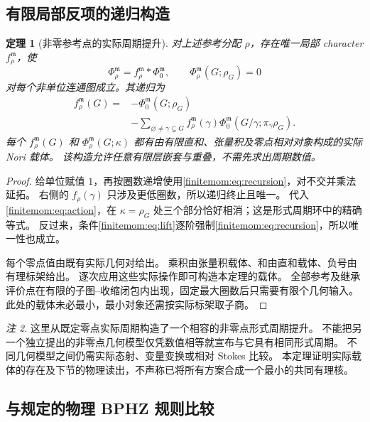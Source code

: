 \documentclass[11pt,a4paper,oneside]{ctexart}
\theoremstyle{cnplain}
\newtheorem{theorem}{定理}[section]
\theoremstyle{definition}
\theoremstyle{remark}
\newtheorem{remark}[theorem]{注}
\numberwithin{equation}{section}
\begin{document}
\subsection{有限局部反项的递归构造}
\begin{theorem}[非零参考点的实际周期提升]\label{finitemom:thm:construction}
对上述参考分配 $\rho$，存在唯一局部 character $f_\rho^{\mathfrak m}$，使
\begin{equation}\label{finitemom:eq:lift}
 \Phi_\rho^{\mathfrak m}=f_\rho^{\mathfrak m}*\Phi_0^{\mathfrak m},
 \qquad \Phi_\rho^{\mathfrak m}(G;\rho_G)=0
\end{equation}
对每个非单位连通图成立。其递归为
\begin{align}\label{finitemom:eq:recursion}
 f_\rho^{\mathfrak m}(G)={}&-\Phi_0^{\mathfrak m}(G;\rho_G)\nonumber\\
 &-\sum_{\varnothing\ne\gamma\subsetneq G}
 f_\rho^{\mathfrak m}(\gamma)
 \Phi_0^{\mathfrak m}(G/\gamma;\pi_\gamma\rho_G).
\end{align}
每个 $f_\rho^{\mathfrak m}(G)$ 和 $\Phi_\rho^{\mathfrak m}(G;\kappa)$ 都有由有限直和、张量积及零点相对对象构成的实际 Nori 载体。
该构造允许任意有限层嵌套与重叠，不需先求出周期数值。
\end{theorem}
\begin{proof}
给单位赋值 $1$，再按圈数递增使用\eqref{finitemom:eq:recursion}，对不交并乘法延拓。
右侧的 $f_\rho(\gamma)$ 只涉及更低圈数，所以递归终止且唯一。
代入\eqref{finitemom:eq:action}，在 $\kappa=\rho_G$ 处三个部分恰好相消；这是形式周期环中的精确等式。
反过来，条件\eqref{finitemom:eq:lift}逐阶强制\eqref{finitemom:eq:recursion}，所以唯一性也成立。

每个零点值由既有实际几何对给出。
乘积由张量积载体、和由直和载体、负号由有理标架给出。
逐次应用这些实际操作即可构造本定理的载体。
全部参考及继承评价点在有限的子图--收缩闭包内出现，固定最大圈数后只需要有限个几何输入。
此处的载体未必最小，最小对象还需按实际标架取子商。
\end{proof}

\begin{remark}
这里从既定零点实际周期构造了一个相容的非零点形式周期提升。
不能把另一个独立提出的非零点几何模型仅凭数值相等就宣布与它具有相同形式周期。
不同几何模型之间仍需实际态射、变量变换或相对 Stokes 比较。
本定理证明实际载体的存在及下节的物理读出，不声称已将所有方案合成一个最小的共同有理核。
\end{remark}


\subsection{与规定的物理 BPHZ 规则比较}
\end{document}
